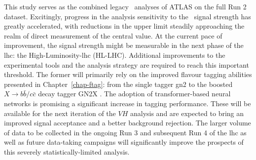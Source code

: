 This study serves as the combined legacy \vhbc\ analyses of ATLAS on the full Run 2 dataset. Excitingly, progress in the analysis sensitivity to the \vhc\ signal strength has greatly accelerated, with reductions in the upper limit steadily approaching the realm of direct measurement of the central value. At the current pace of improvement, the signal strength might be measurable in the next phase of the \gls{lhc}: the High-Luminosity-\gls{lhc} (HL-LHC). Additional improvements to the experimental tools and the analysis strategy are required to reach this important threshold. The former will primarily rely on the improved flavour tagging abilities presented in Chapter~\ref{chap-ftag}: from the single tagger \gls{gn2} to the boosted $X \rightarrow b\bar{b} / c\bar{c}$ decay tagger GN2X \cite{ATL-PHYS-PUB-2023-021}. The adoption of transformer-based neural networks is promising a significant increase in tagging performance. These will be available for the next iteration of the $VH$ analysis and are expected to bring an improved signal acceptance and a better background rejection. The larger volume of data to be collected in the ongoing Run 3 and subsequent Run 4 of the \gls{lhc} as well as future data-taking campaigns will significantly improve the prospects of this severely statistically-limited analysis. 